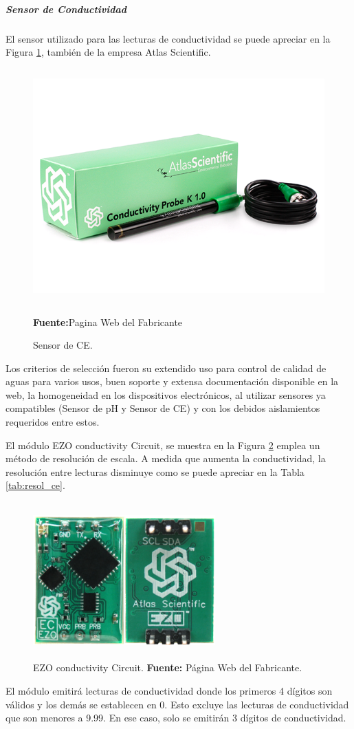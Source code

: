 \subparagraph{Sensor de Conductividad}
El sensor utilizado para las lecturas de conductividad se puede apreciar en la Figura \ref{fig:4.12}, también de la empresa Atlas Scientific.
\begin{figure}[ht]
\centering
	\includegraphics[width=150mm, height=90mm]{Imagenes/2021/imag24.png}%
	\caption[Sensor de CE]{Sensor de CE.  }{\textbf{Fuente:}Pagina Web del Fabricante \cite{atlasce}}
	\label{fig:4.12}
\end{figure}
Los criterios de selección fueron su extendido uso para control de calidad de aguas para varios usos, buen soporte y extensa documentación disponible en la web, la homogeneidad en los dispositivos electrónicos, al utilizar sensores ya compatibles (Sensor de pH y Sensor de CE) y con los debidos aislamientos requeridos entre estos.  
 
El módulo EZO conductivity Circuit, se muestra en la Figura \ref{fig:4.13} emplea un método de resolución de escala. A medida que aumenta la conductividad, la resolución entre lecturas disminuye como se puede apreciar en la Tabla \ref{tab:resol_ce}.
\begin{figure}[ht]
    \centering
    \includegraphics[width=70mm, height=60mm]{Imagenes/2021/imag28.png}
    \caption[EZO conductivity Circuit]{EZO conductivity Circuit. \textbf{Fuente: }Página Web del Fabricante.}
    \label{fig:4.13}
\end{figure}
El módulo emitirá lecturas de conductividad donde los primeros 4 dígitos son válidos y los demás se establecen en 0. Esto excluye las lecturas de conductividad que son menores a 9.99. En ese caso, solo se emitirán 3 dígitos de conductividad.

